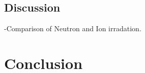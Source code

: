 \documentclass[a4paper]{article}
\begin{document}
%
%
%
%
  \subsection{Discussion} \hspace{10pt}
  -Comparison of Neutron and Ion irradation.

\newpage
\section{Conclusion} \hspace{10pt}
\end{document}
